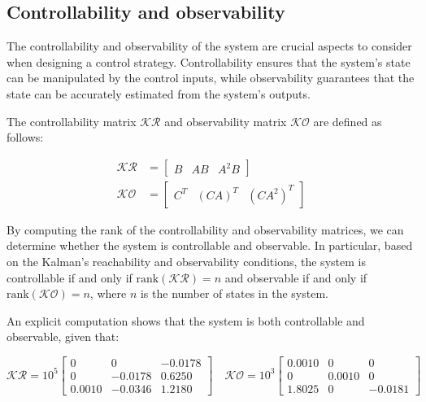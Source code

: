 \subsection{Controllability and observability}
\label{subsec:controllability_observability}

The controllability and observability of the system are crucial aspects to consider when designing a control strategy.
Controllability ensures that the system's state can be manipulated by the control inputs, while observability guarantees that the state can be accurately estimated from the system's outputs.

The controllability matrix $\mathcal{KR}$ and observability matrix $\mathcal{KO}$ are defined as follows:

\begin{equation}
    \begin{aligned}
        \mathcal{KR} & =
        \begin{bmatrix}
            B & AB & A^2B
        \end{bmatrix}   \\
        \mathcal{KO} & =
        \begin{bmatrix}
            C^T & (CA)^T & (CA^2)^T
        \end{bmatrix}
    \end{aligned}
\end{equation}

By computing the rank of the controllability and observability matrices, we can determine whether the system is controllable and observable.
In particular, based on the Kalman's reachability and observability conditions, the system is controllable if and only if $\text{rank}(\mathcal{KR}) = n$ and observable if and only if $\text{rank}(\mathcal{KO}) = n$, where $n$ is the number of states in the system.

An explicit computation shows that the system is both controllable and observable, given that:

\begin{equation}
    \mathcal{KR} = 10^{5}
    \begin{bmatrix}
        0      & 0       & -0.0178 \\
        0      & -0.0178 & 0.6250  \\
        0.0010 & -0.0346 & 1.2180
    \end{bmatrix}
    \quad
    \mathcal{KO} = 10^{3}
    \begin{bmatrix}
        0.0010 & 0      & 0       \\
        0      & 0.0010 & 0       \\
        1.8025 & 0      & -0.0181
    \end{bmatrix}
\end{equation}

